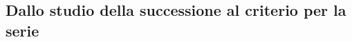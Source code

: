 \subsection{Dallo studio della successione al criterio per la serie}
\label{sec:esercizi-successioni-dalla-successione-alla-serie}
